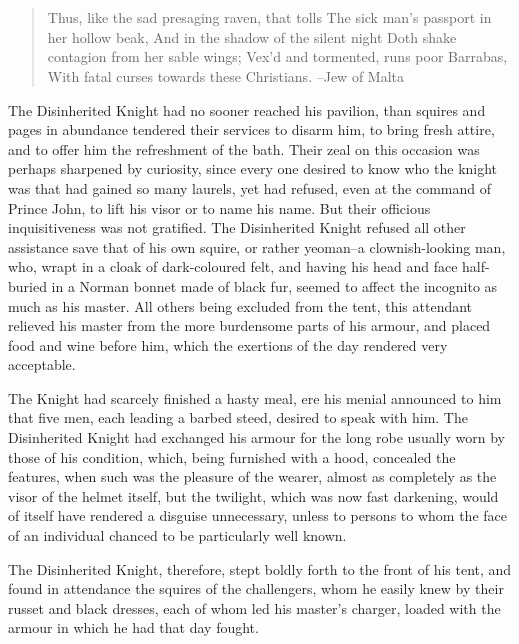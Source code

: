 \chapter{}

\begin{quote}
Thus, like the sad presaging raven, that tolls
The sick man's passport in her hollow beak,
And in the shadow of the silent night
Doth shake contagion from her sable wings;
Vex'd and tormented, runs poor Barrabas,
With fatal curses towards these Christians.
--Jew of Malta
\end{quote}

The Disinherited Knight had no sooner reached his pavilion, than squires
and pages in abundance tendered their services to disarm him, to bring
fresh attire, and to offer him the refreshment of the bath. Their zeal
on this occasion was perhaps sharpened by curiosity, since every one
desired to know who the knight was that had gained so many laurels, yet
had refused, even at the command of Prince John, to lift his visor or to
name his name. But their officious inquisitiveness was not gratified.
The Disinherited Knight refused all other assistance save that of his
own squire, or rather yeoman--a clownish-looking man, who, wrapt in a
cloak of dark-coloured felt, and having his head and face half-buried in
a Norman bonnet made of black fur, seemed to affect the incognito as
much as his master. All others being excluded from the tent, this
attendant relieved his master from the more burdensome parts of his
armour, and placed food and wine before him, which the exertions of the
day rendered very acceptable.

The Knight had scarcely finished a hasty meal, ere his menial announced
to him that five men, each leading a barbed steed, desired to speak with
him. The Disinherited Knight had exchanged his armour for the long robe
usually worn by those of his condition, which, being furnished with a
hood, concealed the features, when such was the pleasure of the wearer,
almost as completely as the visor of the helmet itself, but the
twilight, which was now fast darkening, would of itself have rendered a
disguise unnecessary, unless to persons to whom the face of an
individual chanced to be particularly well known.

The Disinherited Knight, therefore, stept boldly forth to the front of
his tent, and found in attendance the squires of the challengers, whom
he easily knew by their russet and black dresses, each of whom led his
master's charger, loaded with the armour in which he had that day
fought.


